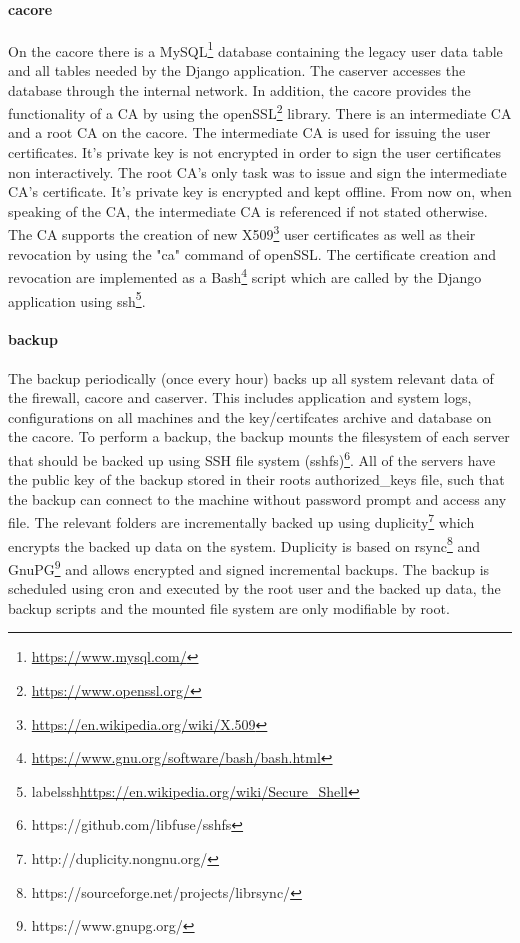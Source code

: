 \documentclass[english]{article}
\begin{document}
\paragraph{cacore}
On the cacore there is a MySQL\footnote{\url{https://www.mysql.com/}} database containing the legacy user data table and all tables needed by the Django application. The caserver accesses the database through the internal network. In addition, the cacore provides the functionality of a CA by using the openSSL\footnote{\label{openssl}\url{https://www.openssl.org/}} library.
There is an intermediate CA and a root CA on the cacore. The intermediate CA is used for issuing the user certificates. It's private key is not encrypted in order to sign the user certificates non interactively. The root CA's only task was to issue and sign the intermediate CA's certificate. It's private key is encrypted and kept offline. From now on, when speaking of the CA, the intermediate CA is referenced if not stated otherwise.
The CA supports the creation of new X509\footnote{\url{https://en.wikipedia.org/wiki/X.509}} user certificates as well as their revocation by using the "ca" command of openSSL. The certificate creation and revocation are implemented as a Bash\footnote{\url{https://www.gnu.org/software/bash/bash.html}} script which are called by the Django application using ssh\footnote{label{ssh}\url{https://en.wikipedia.org/wiki/Secure_Shell}}.

\paragraph{backup} 

The backup periodically (once every hour) backs up all system relevant data of the firewall, cacore and caserver. This includes application and system logs, configurations on all machines and the key/certifcates archive and database on the cacore. To perform a backup, the backup mounts the filesystem of each server that should be backed up using SSH file system (sshfs)\footnote{https://github.com/libfuse/sshfs}. All of the servers have the public key of the backup stored in their roots authorized\_keys file, such that the backup can connect to the machine without password prompt and access any file. The relevant folders are incrementally backed up using duplicity\footnote{http://duplicity.nongnu.org/} which encrypts the backed up data on the system. Duplicity is based on rsync\footnote{https://sourceforge.net/projects/librsync/} and GnuPG\footnote{https://www.gnupg.org/} and allows encrypted and signed incremental backups. The backup is scheduled using cron and executed by the root user and the backed up data, the backup scripts and the mounted file system are only modifiable by root.
 
\end{document}
